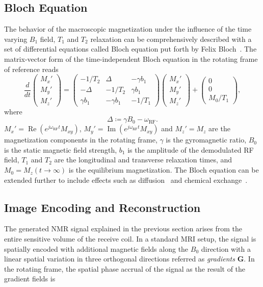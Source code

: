 \subsection{Bloch Equation}
The behavior of the macroscopic magnetization under the influence of the time varying $B_1$ field, $T_1$ and $T_2$ relaxation can be comprehensively described with a set of differential equations called Bloch equation put forth by Felix Bloch~\cite{blochNuclearInduction1946}. The matrix-vector form of the time-independent Bloch equation in the rotating frame of reference reads
\begin{equation}	
\frac{d}{dt}
\begin{pmatrix} 
	M_x' \\
	 M_y' \\
	  M_z' 
	\end{pmatrix} = \begin{pmatrix} 
	-1/T_2 & \Delta & -\gamma b_1 \\
	 -\Delta & -1/T_2 & \gamma b_1 \\ 
	 \gamma b_1 & -\gamma b_1  & -1/T_1 \end{pmatrix}
	 \begin{pmatrix} M_x' \\ M_y' \\ M_z' 
	 \end{pmatrix} 
	 + \begin{pmatrix} 0 
	 	\\ 0 \\ M_0/T_1 \end{pmatrix},
	 	\label{eq:bloch}
\end{equation}
where
	\begin{equation}
		\Delta \coloneq \gamma B_0 -\omega_\text{RF}.
	\end{equation}	
$M_x'=\operatorname{Re}(e^{j\omega_\text{RF}t}M_{xy})$, $M_y'=\operatorname{Im}(e^{j\omega_\text{RF}t}M_{xy})$ and  $M_z'=M_z$ are the magnetization components in the rotating frame, $\gamma$ is the gyromagnetic ratio, $B_0$ is the static magnetic field strength, $b_1$ is the amplitude of the demodulated \gls{RF} field, $T_1$ and $T_2$ are the longitudinal and transverse relaxation times, and $M_0=M_z(t\rightarrow \infty)$ is the equilibrium magnetization. The Bloch equation can be extended further to include effects such as diffusion~\cite{torreyBlochEquationsDiffusion1956} and chemical exchange~\cite{mcconnellReactionRatesNuclear1958}.

\subsection{Image Encoding and Reconstruction}
The generated \gls{NMR} signal explained in the previous section arises from the entire sensitive volume of the receive coil. In a standard \gls{MRI} setup, the signal is spatially encoded with additional magnetic fields along the $B_0$ direction with a linear spatial variation in three orthogonal directions referred as \emph{gradients} $\textbf{G}$. In the rotating frame, the spatial phase accrual of the signal as the result of the gradient fields is

